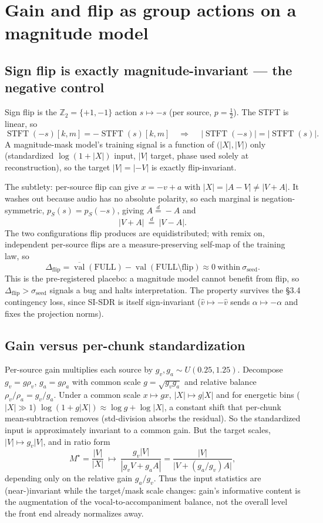 \documentclass[11pt]{article}
\newcommand{\STFT}{\operatorname{STFT}}
\newcommand{\val}{\operatorname{val}}
\newcommand{\dequal}{\stackrel{d}{=}}
\begin{document}
\section{Gain and flip as group actions on a magnitude model}

\subsection{Sign flip is exactly magnitude-invariant --- the negative control}

Sign flip is the $\mathbb Z_2=\{+1,-1\}$ action $s\mapsto-s$ (per source,
$p=\tfrac12$). The STFT is linear, so
\[
\STFT(-s)[k,m]=-\STFT(s)[k,m]
\quad\Longrightarrow\quad
\boxed{\ \big|\STFT(-s)\big|=\big|\STFT(s)\big|.\ }
\]
A magnitude-mask model's training signal is a function of $\big(|X|,|V|\big)$ only
(standardized $\log(1+|X|)$ input, $|V|$ target, phase used solely at
reconstruction), so the target $|V|=|{-V}|$ is exactly flip-invariant.

The subtlety: per-source flip can give $x=-v+a$ with $|X|=|A-V|\neq|V+A|$. It washes
out because audio has no absolute polarity, so each marginal is negation-symmetric,
$p_S(s)=p_S(-s)$, giving $A\dequal-A$ and
\[
|V+A|\ \dequal\ |V-A|.
\]
The two configurations flip produces are equidistributed; with remix on, independent
per-source flips are a measure-preserving self-map of the training law, so
\[
\boxed{\ \Delta_{\text{flip}}
=\overline{\val}(\text{FULL})-\val(\text{FULL}\setminus\text{flip})\approx0
\ \text{within}\ \sigma_{\text{seed}}.\ }
\]
This is the pre-registered placebo: a magnitude model cannot benefit from flip, so
$\Delta_{\text{flip}}>\sigma_{\text{seed}}$ signals a bug and halts interpretation.
The property survives the \S3.4 contingency loss, since SI-SDR is itself
sign-invariant ($\hat v\mapsto-\hat v$ sends $\alpha\mapsto-\alpha$ and fixes the
projection norms).

\subsection{Gain versus per-chunk standardization}

Per-source gain multiplies each source by $g_v,g_a\sim U(0.25,1.25)$. Decompose
$g_v=g\rho_v$, $g_a=g\rho_a$ with common scale $g=\sqrt{g_vg_a}$ and relative balance
$\rho_v/\rho_a=g_v/g_a$. Under a common scale $x\mapsto gx$, $|X|\mapsto g|X|$ and for
energetic bins ($|X|\gg1$) $\log(1+g|X|)\approx\log g+\log|X|$, a constant shift that
per-chunk mean-subtraction removes (std-division absorbs the residual). So the
standardized input is approximately invariant to a common gain. But the target scales,
$|V|\mapsto g_v|V|$, and in ratio form
\[
M^\star=\frac{|V|}{|X|}\ \longmapsto\
\frac{g_v|V|}{|g_vV+g_aA|}=\frac{|V|}{\big|V+(g_a/g_v)A\big|},
\]
depending only on the relative gain $g_a/g_v$. Thus the input statistics are
(near-)invariant while the target/mask scale changes: gain's informative content is
the augmentation of the vocal-to-accompaniment balance, not the overall level the
front end already normalizes away.
\end{document}
